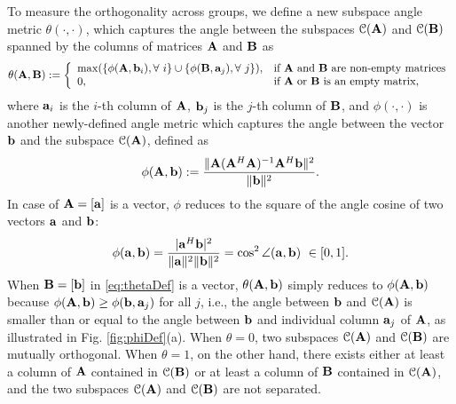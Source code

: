 \documentclass[11pt, draft, onecolumn ]{IEEEtran}
\begin{document}
To measure the orthogonality across groups, we define a new subspace angle metric
$\theta(\cdot, \cdot)$, which captures the angle between the subspaces  ${\cal C}({\bf A})$ and ${\cal C}({\bf B})$ spanned
by the columns of matrices ${\bf A}$ and ${\bf B}$ as
\begin{equation}  \label{eq:thetaDef}
    \theta({\bf A},{\bf B}) := \left\{\begin{array}{ll}
    \max (\{\phi({\bf A},{\bf b}_i), \forall~ i\} \cup \{\phi({\bf B},{\bf a}_j), \forall~ j\} ), & \mbox{if ${\bf A}$ and ${\bf B}$ are non-empty matrices}\\
    0, & \mbox{if}~ {\bf A} ~\mbox{or}~{\bf B}~\mbox{is an empty matrix},
    \end{array}
    \right.
\end{equation}
where ${\bf a}_i$ is the $i$-th column of ${\bf A}$,  ${\bf b}_j$ is the $j$-th column of ${\bf B}$,  and $\phi(\cdot,\cdot)$ is another newly-defined
 angle metric which captures the angle between the vector ${\bf b}$ and the subspace ${\cal C}({\bf A})$, defined as
\begin{equation}  \label{eq:phiAbfbbf}
    \phi({\bf A}, {\bf b}) := \frac{\|{\bf A}({\bf A}^H{\bf A})^{-1}{\bf A}^H {\bf b}\|^2}{\|{\bf b}\|^2}.
\end{equation}
In case of ${\bf A} = [{\bf a}]$ is a vector, $\phi$ reduces to the square of the angle cosine  of two vectors ${\bf a}$ and ${\bf b}$:
\begin{equation}
    \phi({\bf a}, {\bf b}) = \frac{|{\bf a}^H {\bf b}|^2}{\|{\bf a}\|^2\|{\bf b}\|^2} = \cos^2 \angle ({\bf a},{\bf b}) ~\in [0,1].
\end{equation}
When ${\bf B}=[{\bf b}]$ in   \eqref{eq:thetaDef}  is a vector,  $\theta({\bf A},{\bf b})$ simply reduces to $\phi({\bf A}, {\bf b})$ because $\phi({\bf A},{\bf b}) \ge \phi({\bf b},{\bf a}_j)$ for all $j$, i.e., the angle between ${\bf b}$ and ${\cal C}({\bf A})$ is smaller than or equal to the angle between ${\bf b}$ and individual column ${\bf a}_j$ of ${\bf A}$, as illustrated in Fig. \ref{fig:phiDef}(a). When $\theta=0$,  two subspaces ${\cal C}({\bf A})$ and ${\cal C}({\bf B})$ are mutually orthogonal. When $\theta=1$, on the other hand,  there exists either at least a column of ${\bf A}$ contained in ${\cal C}({\bf B})$ or at least a column of ${\bf B}$ contained in ${\cal C}({\bf A})$, and the two subspaces ${\cal C}({\bf A})$ and ${\cal C}({\bf B})$ are not separated.
\end{document}
